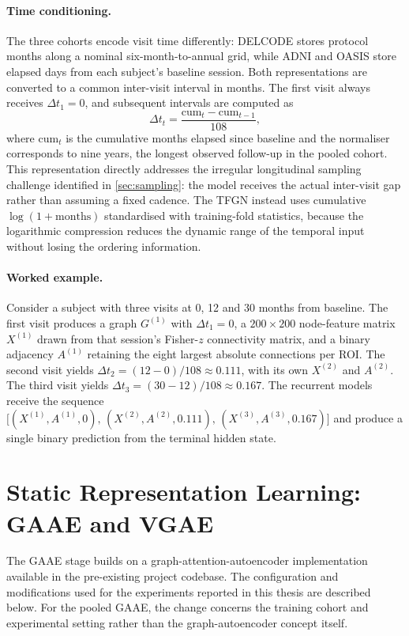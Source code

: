 \paragraph{Time conditioning.}
The three cohorts encode visit time differently: \ac{DELCODE} stores protocol months along
a nominal six-month-to-annual grid, while \ac{ADNI} and \ac{OASIS} store elapsed days from
each subject's baseline session. Both representations are converted to a common inter-visit
interval in months. The first visit always receives $\Delta t_1 = 0$, and subsequent
intervals are computed as
\[
  \Delta t_t = \frac{\text{cum}_t - \text{cum}_{t-1}}{108},
\]
where $\text{cum}_t$ is the cumulative months elapsed since baseline and the normaliser corresponds 
to nine years, the longest observed follow-up in the pooled cohort. 
This representation directly addresses the irregular
longitudinal sampling challenge identified in \autoref{sec:sampling}: the model receives
the actual inter-visit gap rather than assuming a fixed cadence. The \ac{TFGN} instead
uses cumulative $\log(1 + \text{months})$ standardised with training-fold statistics,
because the logarithmic compression reduces the dynamic range of the temporal input without
losing the ordering information.

\paragraph{Worked example.}
Consider a subject with three visits at 0, 12 and 30 months from baseline. The first visit
produces a graph $G^{(1)}$ with $\Delta t_1 = 0$, a $200 \times 200$ node-feature matrix
$X^{(1)}$ drawn from that session's Fisher-$z$ connectivity matrix, and a binary adjacency
$A^{(1)}$ retaining the eight largest absolute connections per \ac{ROI}. The second visit
yields $\Delta t_2 = (12 - 0)/108 \approx 0.111$, with its own $X^{(2)}$ and $A^{(2)}$.
The third visit yields $\Delta t_3 = (30 - 12)/108 \approx 0.167$. The recurrent models
receive the sequence $\bigl[(X^{(1)}, A^{(1)}, 0),\, (X^{(2)}, A^{(2)}, 0.111),\,
(X^{(3)}, A^{(3)}, 0.167)\bigr]$ and produce a single binary prediction from the terminal
hidden state.

\section{Static Representation Learning: GAAE and VGAE}\label{sec:static-representation}

The \ac{GAAE} stage builds on a graph-attention-autoencoder implementation available in
the pre-existing project codebase. The configuration and modifications used for the
experiments reported in this thesis are described below. For the pooled \ac{GAAE}, the
change concerns the training cohort and experimental setting rather than the
graph-autoencoder concept itself.

